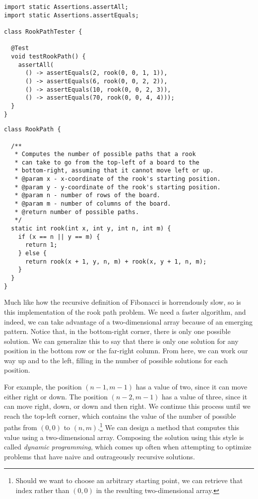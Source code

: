 \begin{lstlisting}[language=MyJava]
import static Assertions.assertAll;
import static Assertions.assertEquals;

class RookPathTester {

  @Test
  void testRookPath() {
    assertAll(
      () -> assertEquals(2, rook(0, 0, 1, 1)),
      () -> assertEquals(6, rook(0, 0, 2, 2)),
      () -> assertEquals(10, rook(0, 0, 2, 3)),
      () -> assertEquals(70, rook(0, 0, 4, 4)));
  }
}
\end{lstlisting}

\begin{lstlisting}[language=MyJava]
class RookPath {

  /**
   * Computes the number of possible paths that a rook 
   * can take to go from the top-left of a board to the 
   * bottom-right, assuming that it cannot move left or up.
   * @param x - x-coordinate of the rook's starting position.
   * @param y - y-coordinate of the rook's starting position.
   * @param n - number of rows of the board.
   * @param m - number of columns of the board.
   * @return number of possible paths.
   */
  static int rook(int x, int y, int n, int m) {
    if (x == n || y == m) { 
      return 1; 
    } else { 
      return rook(x + 1, y, n, m) + rook(x, y + 1, n, m); 
    }
  }
}
\end{lstlisting}

Much like how the recursive definition of Fibonacci is horrendously slow, so is this implementation of the rook path problem. 
We need a faster algorithm, and indeed, we can take advantage of a two-dimensional array because of an emerging pattern. 
Notice that, in the bottom-right corner, there is only one possible solution. 
We can generalize this to say that there is only one solution for any position in the bottom row or the far-right column. 
From here, we can work our way up and to the left, filling in the number of possible solutions for each position. 

For example, the position $(n - 1, m - 1)$ has a value of two, since it can move either right or down. 
The position $(n - 2, m - 1)$ has a value of three, since it can move right, down, or down and then right. 
We continue this process until we reach the top-left corner, which contains the value of the number of possible paths from $(0, 0)$ to $(n, m)$.\footnote{Should we want to choose an arbitrary starting point, we can retrieve that index rather than $(0, 0)$ in the resulting two-dimensional array.} 
We can design a method that computes this value using a two-dimensional array. 
Composing the solution using this style is called \emph{dynamic programming}, which comes up often when attempting to optimize problems that have naive and outrageously recursive solutions.

